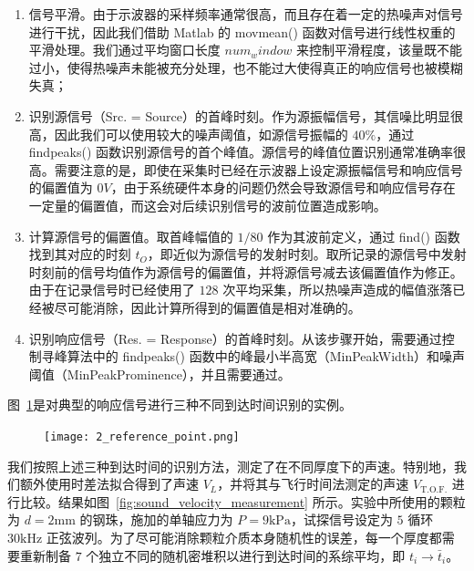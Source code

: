 \begin{enumerate}
  \item 信号平滑。由于示波器的采样频率通常很高，而且存在着一定的热噪声对信号进行干扰，因此我们借助 Matlab 的 movmean() 函数对信号进行线性权重的平滑处理。我们通过平均窗口长度 $num_window$ 来控制平滑程度，该量既不能过小，使得热噪声未能被充分处理，也不能过大使得真正的响应信号也被模糊失真；
  \item 识别源信号（Src. = Source）的首峰时刻。作为源振幅信号，其信噪比明显很高，因此我们可以使用较大的噪声阈值，如源信号振幅的 $40\%$，通过 findpeaks() 函数识别源信号的首个峰值。源信号的峰值位置识别通常准确率很高。需要注意的是，即使在采集时已经在示波器上设定源振幅信号和响应信号的偏置值为 $0\unit{V}$，由于系统硬件本身的问题仍然会导致源信号和响应信号存在一定量的偏置值，而这会对后续识别信号的波前位置造成影响。
  \item 计算源信号的偏置值。取首峰幅值的 $1/80$ 作为其波前定义，通过 find() 函数找到其对应的时刻 $t_{O}$，即近似为源信号的发射时刻。取所记录的源信号中发射时刻前的信号均值作为源信号的偏置值，并将源信号减去该偏置值作为修正。由于在记录信号时已经使用了 $128$ 次平均采集，所以热噪声造成的幅值涨落已经被尽可能消除，因此计算所得到的偏置值是相对准确的。
  \item 识别响应信号（Res. = Response）的首峰时刻。从该步骤开始，需要通过控制寻峰算法中的 findpeaks() 函数中的峰最小半高宽（MinPeakWidth）和噪声阈值（MinPeakProminence），并且需要通过。
\end{enumerate}

图~\ref{fig:reference_point}是对典型的响应信号进行三种不同到达时间识别的实例。


\begin{figure}[!htp]
  \centering
  \texttt{[image: 2\_reference\_point.png]}
  \label{fig:reference_point}
\end{figure}

我们按照上述三种到达时间的识别方法，测定了在不同厚度下的声速。特别地，我们额外使用时差法拟合得到了声速 $V_{L}$，并将其与飞行时间法测定的声速 $V_{\text{T.O.F.}}$ 进行比较。结果如图~\ref{fig:sound_velocity_measurement} 所示。实验中所使用的颗粒为 $d=2\unit{\milli\meter}$ 的钢珠，施加的单轴应力为 $P=9\unit{\kilo\Pa}$，试探信号设定为 $5$ 循环 $30\unit{\kilo\Hz}$ 正弦波列。为了尽可能消除颗粒介质本身随机性的误差，每一个厚度都需要重新制备 $7$ 个独立不同的随机密堆积以进行到达时间的系综平均，即 $t_{i}\rightarrow \bar{t}_{i}$。

